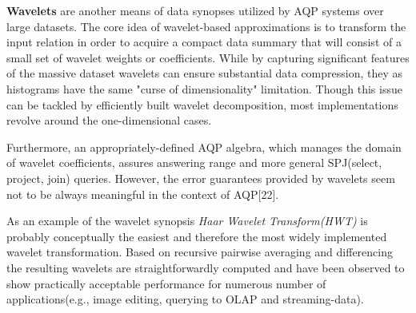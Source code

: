 \documentclass[10pt, conference, compsocconf]{IEEEtran}
\begin{document}
\textbf{Wavelets} are another means of data synopses utilized by AQP systems over large datasets. The core idea of wavelet-based approximations is to transform the input relation in order to acquire a compact data summary that will consist of a small set of wavelet weights or coefficients. While by capturing significant features of the massive dataset wavelets can ensure substantial data compression, they as histograms have the same "curse of dimensionality" limitation. Though this issue can be tackled by efficiently built wavelet decomposition, most implementations revolve around the one-dimensional cases. 

Furthermore, an appropriately-defined AQP algebra, which manages the domain of wavelet coefficients, assures answering range and more general SPJ(select, project, join) queries. However, the error guarantees provided by wavelets seem not to be always meaningful in the context of AQP[22].

As an example of the wavelet synopsis \textit{Haar Wavelet Transform(HWT)} is probably conceptually the easiest and therefore the most widely implemented wavelet transformation. Based on recursive pairwise averaging and differencing the resulting wavelets are straightforwardly computed and have been observed to show practically acceptable performance for numerous number of applications(e.g., image editing, querying to OLAP and streaming-data).\\
\end{document}
